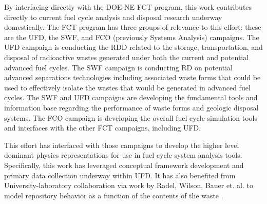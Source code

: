 
By interfacing directly with the DOE-NE \gls{FCT} program, this work 
contributes directly to current fuel cycle analysis and disposal research 
underway domestically. The \gls{FCT} program has three groups of relevance to
this effort: these are the \gls{UFD}, the \gls{SWF}, and \gls{FCO} (previously
Systems Analysis) campaigns.  The \gls{UFD} campaign is conducting the
\gls{RDD} related to the storage, transportation, and disposal of radioactive
wastes generated under both the current and potential advanced fuel cycles.
The \gls{SWF} campaign is conducting \gls{RD} on potential advanced separations
technologies including associated waste forms that could be used to effectively
isolate the wastes that would be generated in advanced fuel cycles.  The
\gls{SWF} and \gls{UFD} campaigns are developing the fundamental tools and
information base regarding the performance of waste forms and geologic disposal
systems.  The \gls{FCO} campaign is developing the overall fuel cycle
simulation tools and interfaces with the other FCT campaigns, including
\gls{UFD}.  

This effort has interfaced with those campaigns to develop the higher level 
dominant physics representations for use in fuel cycle system analysis tools.  
Specifically, this work has leveraged conceptual framework development and 
primary data collection underway within \gls{UFD}.  It has also benefited from 
University-laboratory collaboration via work by Radel, Wilson, Bauer et. al. to 
model repository behavior as a function of the contents of the waste 
\cite{radel_effect_2007}.  
